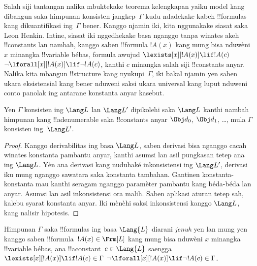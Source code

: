 \documentclass[../../../include/open-logic-section]{subfiles}
\begin{document}


\begin{explain}
Salah siji tantangan nalika mbuktekake teorema kelengkapan yaiku model
kang dibangun saka himpunan konsisten jangkep~$\Gamma$ kudu ndadekake
kabeh !!{formula}s kang dikuantifikasi ing~$\Gamma$ bener. Kanggo
njamin iki, kita nggunakake siasat saka Leon Henkin. Intine, siasat
iki nggedhekake basa nganggo tanpa winates akeh !!{constant}s lan
nambah, kanggo saben !!{formula} $!A(x)$ kang mung bisa nduwèni
$x$ minangka !!{variable} bébas, formula awujud
      {$\lexists[x][!A(x)] \lif !A(c)$}
      {$\lnot\lforall[x][!A(x)] \lif \lnot !A(c)$},
kanthi $c$ minangka salah siji !!{constant}s anyar. Nalika kita
mbangun !!{structure} kang nyukupi~$\Gamma$, iki bakal njamin yen saben
{ukara eksistensial kang bener nduweni saksi}
{ukara universal kang luput nduweni conto panolak}
ing antarane konstanta anyar kasebut.
\end{explain}

\begin{prop}
Yen $\Gamma$ konsisten ing $\Lang L$ lan $\Lang L'$ dipikolehi saka
$\Lang L$ kanthi nambah himpunan kang !!a{denumerable} saka !!{constant}s anyar
$\Obj d_0$, $\Obj d_1$, \dots, mula $\Gamma$ konsisten ing~$\Lang L'$.
\end{prop}
\begin{proof}
Kanggo derivabilitas ing basa $\Lang L$, saben derivasi bisa nganggo cacah winates konstanta pambantu anyar,
kanthi asumsi lan asil pungkasan tetep ana ing $\Lang L$.
Yèn ana derivasi kang nuduhaké inkonsistensi ing $\Lang L'$, derivasi
iku mung nganggo sawatara saka konstanta tambahan. Gantinen
konstanta-konstanta mau kanthi seragam nganggo paramèter pambantu
kang béda-béda lan anyar. Asumsi lan asil inkonsistensi ora malih.
Saben aplikasi aturan tetep sah, kalebu syarat konstanta anyar.
Iki mènèhi saksi inkonsistensi kanggo $\Lang L$, kang nalisir hipotesis.
\end{proof}

\begin{defn}
Himpunan $\Gamma$ saka !!{formula}s ing basa $\Lang {L}$ diarani
\emph{jenuh} yen lan mung yen kanggo saben !!{formula}~$!A(x) \in
\Frm[L]$ kang mung bisa nduwèni $x$ minangka !!{variable} bébas,
ana !!a{constant}~$c \in
\Lang{L}$ saengga
      {$\lexists[x][!A(x)] \lif !A(c) \in \Gamma$}
      {$\lnot\lforall[x][!A(x)] \lif \lnot !A(c) \in \Gamma$}.
\end{defn}
\end{document}
